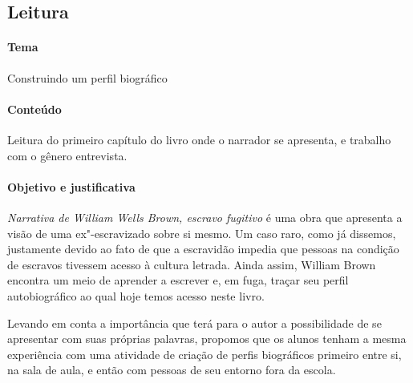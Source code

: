 \documentclass[12pt]{extarticle}
\begin{document}
\subsection{Leitura}

 \paragraph{Tema} Construindo um perfil biográfico

 \paragraph{Conteúdo} Leitura do primeiro capítulo do livro onde o
 narrador se apresenta, e trabalho com o gênero entrevista. 

 \paragraph{Objetivo e justificativa} \emph{Narrativa de William Wells Brown, escravo fugitivo}
 é uma obra que apresenta a visão de uma ex"-escravizado sobre si mesmo. 
 Um caso raro, como já dissemos, justamente devido ao fato de que a 
 escravidão impedia que pessoas na condição de escravos tivessem acesso
 à cultura letrada. Ainda assim, William Brown encontra um meio de aprender
 a escrever e, em fuga, traçar seu perfil autobiográfico ao qual hoje temos acesso
 neste livro.

 Levando em conta a importância que terá para o autor a possibilidade
 de se apresentar com suas próprias palavras, propomos que os alunos
 tenham a mesma experiência com uma atividade de criação de perfis 
 biográficos primeiro entre si, na sala de aula, e então com pessoas
 de seu entorno fora da escola.
\end{document}
